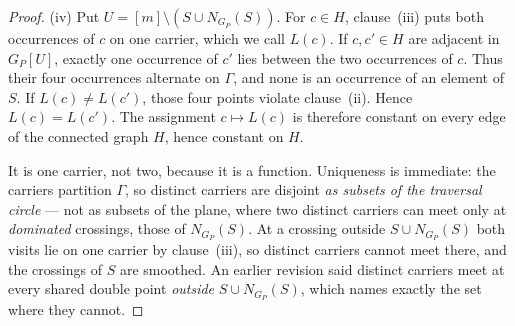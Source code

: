 \begin{proof}
(iv) Put $U=[m]\setminus(S\cup N_{G_P}(S))$. For $c\in H$, clause~(iii) puts
both occurrences of $c$ on one carrier, which we call $L(c)$. If $c,c'\in H$
are adjacent in $G_P[U]$, exactly one occurrence of $c'$ lies between the two
occurrences of $c$. Thus their four occurrences alternate on $\Gamma$, and none
is an occurrence of an element of $S$. If $L(c)\neq L(c')$, those four points
violate clause~(ii). Hence $L(c)=L(c')$. The assignment $c\mapsto L(c)$ is
therefore constant on every edge of the connected graph $H$, hence constant on
$H$.

It is one carrier, not two, because it is a function. Uniqueness is immediate:
the carriers partition $\Gamma$, so distinct carriers are disjoint \emph{as
subsets of the traversal circle} --- not as subsets of the plane, where two
distinct carriers can meet only at \emph{dominated} crossings, those of
$N_{G_P}(S)$. At a crossing outside $S\cup N_{G_P}(S)$ both visits lie on one
carrier by clause~(iii), so distinct carriers cannot meet there, and the
crossings of $S$ are smoothed. An earlier revision said distinct carriers meet
at every shared double point \emph{outside} $S\cup N_{G_P}(S)$, which names
exactly the set where they cannot.
\end{proof}

